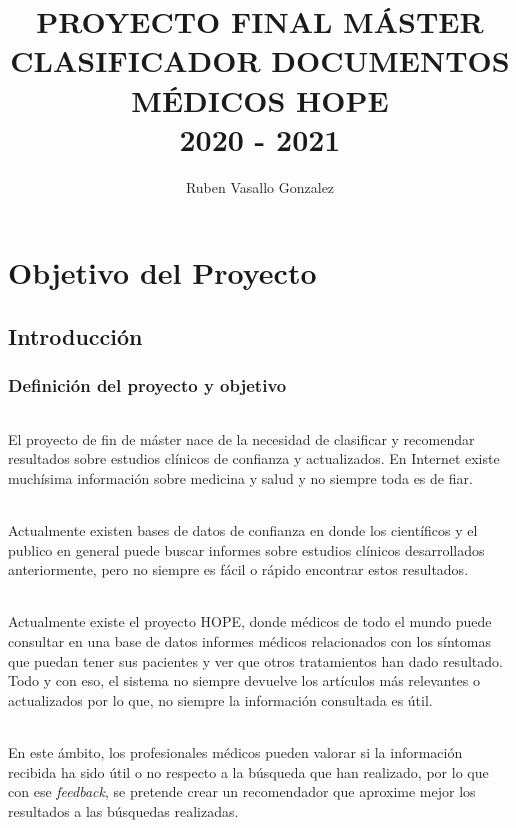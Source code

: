 \documentclass[10pt,a4paper]{book}
\author{Ruben Vasallo Gonzalez}
\title{PROYECTO FINAL MÁSTER \\ CLASIFICADOR DOCUMENTOS MÉDICOS HOPE \\ 2020 - 2021}
\begin{document}
\maketitle

\tableofcontents

\part{Objetivo del Proyecto}

\chapter{Introducción}

\section{Definición del proyecto y objetivo}

\paragraph{}
El proyecto de fin de máster nace de la necesidad de clasificar y recomendar resultados sobre estudios clínicos de confianza y actualizados. En Internet existe muchísima información sobre medicina y salud y no siempre toda es de fiar.

\paragraph{}
Actualmente existen bases de datos de confianza en donde los científicos y el publico en general puede buscar informes sobre estudios clínicos desarrollados anteriormente, pero no siempre es fácil o rápido encontrar estos resultados.

\paragraph{}
Actualmente existe el proyecto HOPE, donde médicos de todo el mundo puede consultar en una base de datos informes médicos relacionados con los síntomas que puedan tener sus pacientes y ver que otros tratamientos han dado resultado. Todo y con eso, el sistema no siempre devuelve los artículos más relevantes o actualizados por lo que, no siempre la información consultada es útil.

\paragraph{}
En este ámbito, los profesionales médicos pueden valorar si la información recibida ha sido útil o no respecto a la búsqueda que han realizado, por lo que con ese \textit{feedback}, se pretende crear un recomendador que aproxime mejor los resultados a las búsquedas realizadas.
\end{document}
